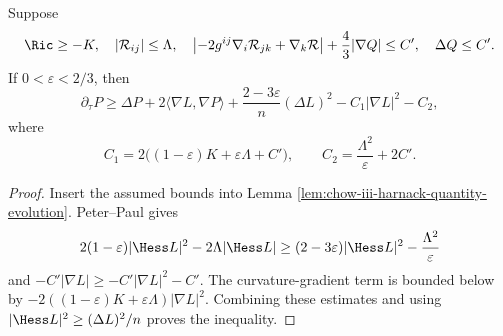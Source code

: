 \begin{corollary}
\label{cor:chow-iii-harnack-quantity-evolution-inequality}
Suppose
\[
 \Ric\geq-K,\quad |\mathcal R_{ij}|\leq\Lambda,
\quad
 \left|-2g^{ij}\nabla_i\mathcal R_{jk}+\nabla_k\mathcal R\right|
 +\frac43|\nabla Q|\leq C',\quad \Delta Q\leq C'.
\]
If \(0<\varepsilon<2/3\), then
\[
 \partial_\tau P\geq\Delta P+2\langle\nabla L,\nabla P\rangle
 +\frac{2-3\varepsilon}{n}(\Delta L)^2
 -C_1|\nabla L|^2-C_2,
\]
where
\[
 C_1=2\bigl((1-\varepsilon)K+\varepsilon\Lambda+C'\bigr),
 \qquad C_2=\frac{\Lambda^2}{\varepsilon}+2C'.
\]
\end{corollary}
\begin{proof}
\sketch Insert the assumed bounds into Lemma
\ref{lem:chow-iii-harnack-quantity-evolution}.  Peter--Paul gives
\[
 2(1-\varepsilon)|\Hess L|^2-2\Lambda|\Hess L|
 \geq(2-3\varepsilon)|\Hess L|^2-\frac{\Lambda^2}{\varepsilon}
\]
and
\(-C'|\nabla L|\geq-C'|\nabla L|^2-C'\).  The curvature-gradient term is
bounded below by
\(-2((1-\varepsilon)K+\varepsilon\Lambda)|\nabla L|^2\).
Combining these estimates and using
\(|\Hess L|^2\geq(\Delta L)^2/n\) proves the inequality.
\end{proof}
